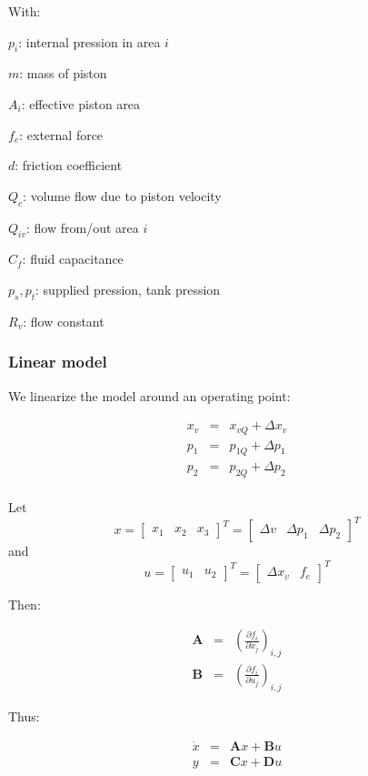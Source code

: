 With:

$p_i$: internal pression in area $i$

$m$: mass of piston

$A_i$: effective piston area

$f_e$: external force

$d$: friction coefficient

$Q_c$: volume flow due to piston velocity

$Q_{iv}$: flow from/out area $i$

$C_f$: fluid capacitance

$p_s, p_t$: supplied pression, tank pression

$R_v$: flow constant

\subsubsection*{Linear model}
We linearize the model around an operating point:

$$\begin{array}{rcl}
   x_v & = & x_{vQ} + \Delta x_v \\
   p_1 & = & p_{1Q} + \Delta p_1 \\
   p_2 & = & p_{2Q} + \Delta p_2 \\
  \end{array}$$

Let $$x = \left[\begin{array}{ccc}x_1 & x_2 & x_3 \end{array}\right]^T = \left[\begin{array}{ccc} \Delta v & \Delta p_1 & \Delta p_2 \end{array}\right]^T$$ and $$u = \left[\begin{array}{cc}u_1 & u_2 \end{array}\right]^T = \left[\begin{array}{cc} \Delta x_v & f_e \end{array}\right]^T$$

Then:

$$ \begin{array}{rcl} 
    \bm{A} & = & \left(\frac{\partial f_i}{\partial x_j}\right)_{i,j} \\
    \bm{B} & = & \left(\frac{\partial f_i}{\partial u_j}\right)_{i,j}
   \end{array}$$
   
Thus:

$$ \begin{array}{rcl}
    \dot{x} & = &  \bm{A}x + \bm{B}u \\
    y & = & \bm{C}x + \bm{D}u
   \end{array}$$
   
